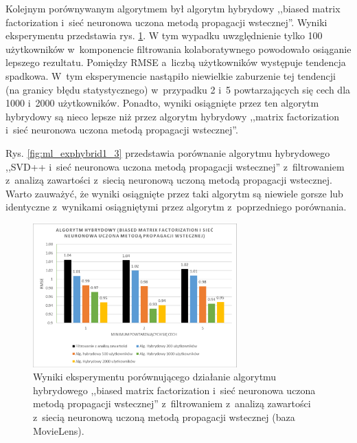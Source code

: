 \documentclass[twoside]{iisthesis}
\begin{document}
		Kolejnym porównywanym algorytmem był algorytm hybrydowy ,,biased matrix factorization i~sieć neuronowa uczona metodą propagacji wstecznej''. Wyniki eksperymentu przedstawia rys. \ref{fig:ml_exphybrid1_2}. 
		W tym wypadku uwzględnienie tylko 100 użytkowników w~komponencie filtrowania kolaboratywnego powodowało osiąganie lepszego rezultatu. Pomiędzy RMSE a~liczbą użytkowników występuje tendencja spadkowa. W~tym eksperymencie nastąpiło niewielkie zaburzenie tej tendencji (na granicy błędu statystycznego) w~przypadku 2 i~5 powtarzających się cech dla 1000 i~2000 użytkowników. Ponadto, wyniki osiągnięte przez ten algorytm hybrydowy są nieco lepsze niż przez algorytm hybrydowy ,,matrix factorization i~sieć neuronowa uczona metodą propagacji wstecznej''.
		
		Rys. \ref{fig:ml_exphybrid1_3} przedstawia porównanie algorytmu hybrydowego ,,SVD++ i~sieć neuronowa uczona metodą propagacji wstecznej'' z~filtrowaniem z~analizą zawartości z~siecią neuronową uczoną metodą propagacji wstecznej. Warto zauważyć, że wyniki osiągnięte przez taki algorytm są niewiele gorsze lub identyczne z~wynikami osiągniętymi przez algorytm z~poprzedniego porównania. 
	
		\begin{figure}
			\centering
			\includegraphics[width=0.7\textwidth]{ml_exphybrid1_2}			
			\caption{Wyniki eksperymentu porównującego działanie algorytmu hybrydowego ,,biased matrix factorization i~sieć neuronowa uczona metodą propagacji wstecznej'' z~filtrowaniem z~analizą zawartości z~siecią neuronową uczoną metodą propagacji wstecznej (baza MovieLens).}
			\label{fig:ml_exphybrid1_2}
		\end{figure}
	
\end{document}
